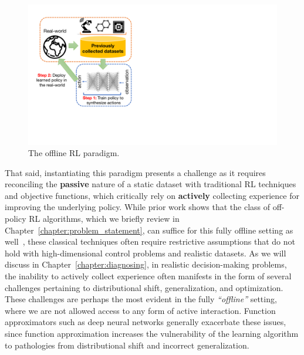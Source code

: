 \documentclass[../thesis.tex]{subfiles}
\begin{document}
\begin{figure} 
    \vspace{-10pt}
    \centering
    \includegraphics[width=0.99\linewidth]{offline_rl_fig.pdf}
    \vspace{-0.5cm}
    \caption{\label{fig:offline_rl_sketch} \footnotesize{The offline RL paradigm.}}
    \vspace{-0.5cm}
\end{figure}
That said, instantiating this paradigm presents a challenge as it requires reconciling the \textbf{passive} nature of a static dataset with traditional RL techniques and objective functions, which critically rely on \textbf{actively} collecting experience for improving the underlying policy. While prior work shows that the class of off-policy RL algorithms, which we briefly review in Chapter~\ref{chapter:problem_statement}, can suffice for this fully offline setting as well~\citep{lange2012batch,chen2019information,munos2003errorapi,munos2005erroravi}, these classical techniques often require restrictive assumptions that do not hold with high-dimensional control problems and realistic datasets. As we will discuss in Chapter~\ref{chapter:diagnosing}, in realistic decision-making problems, the inability to actively collect experience often manifests in the form of several challenges pertaining to distributional shift, generalization, and optimization. These challenges are perhaps the most evident in the fully \emph{``offline''} setting, where we are not allowed access to any form of active interaction. Function approximators such as deep neural networks generally exacerbate these issues, since function approximation increases the vulnerability of the learning algorithm to pathologies from distributional shift and incorrect generalization.
\end{document}

